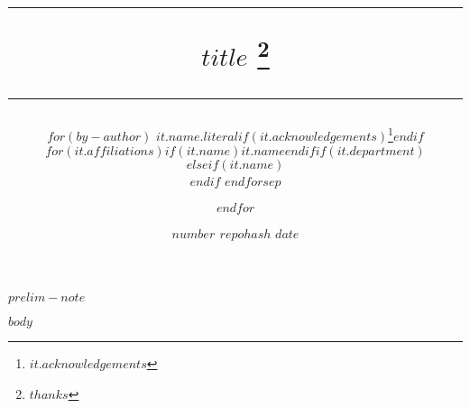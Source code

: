 \documentclass[12pt,a4paper,oneside]{article} %
\begin{document}

\setlength{\droptitle}{-8em}  %
	\title{	\rule{\linewidth}{0.5mm} \textbf{
		{\LARGE $title$ \vspace{-15pt} }}\thanks{\noindent { }$thanks$}  \rule{\linewidth}{0.5mm}  }
\date{\hspace{87pt}\scriptsize{\textbf{$number$ $repohash$}} \vspace{-5pt} \newline  \normalsize $date$} 

\author{
	$for(by-author)$
	\textbf{$it.name.literal$}$if(it.acknowledgements)$\thanks{ { }$it.acknowledgements$}$endif$\\
	$for(it.affiliations)$$if(it.name)$\small{$it.name$}$endif$$if(it.department)$\\$elseif(it.name)$\vspace{-1.5ex}\\$endif$
	$endfor$$sep$\and$endfor$\vspace{10pt}}

\maketitle
\thispagestyle{empty}

\begin{center}
\vspace{-25pt}	\noindent \textit{$prelim-note$}
\end{center}

\begin{abstract}
	\vspace{-15pt}	
\end{abstract}
\thispagestyle{empty}

\clearpage
\setcounter{page}{1}
\clearpage
\newpage{}

$body$
\end{document}
